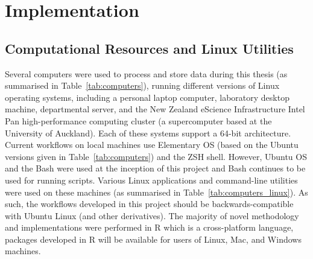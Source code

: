 \section{Implementation}



\subsection{Computational Resources and Linux Utilities}

Several computers were used to process and store data during this thesis (as summarised in Table~\ref{tab:computers}), running different versions of Linux operating systems, including a personal laptop computer, laboratory desktop machine, departmental server, and the New Zealand eScience Infrastructure Intel Pan high-performance computing cluster (a supercomputer based at the University of Auckland). Each of these systems support a 64-bit architecture. Current workflows on local machines use Elementary OS (based on the Ubuntu versions given in Table~\ref{tab:computers}) and the ZSH shell. However, Ubuntu OS and the \gls{Bash} were used at the inception of this project and \gls{Bash} continues to be used for running scripts. Various Linux applications and command-line utilities were used on these machines (as summarised in Table~\ref{tab:computers_linux}). As such, the workflows developed in this project should be backwards-compatible with Ubuntu Linux (and other derivatives). The majority of novel methodology and implementations were performed in R which is a cross-platform language, packages developed in R will be available for users of Linux, Mac, and Windows machines.  


